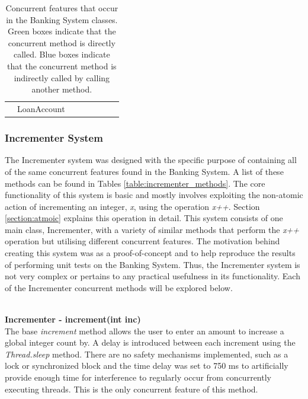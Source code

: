 \documentclass[a4paper,12pt]{article}
\begin{document}
\begin{table}[]
\begin{tabular}{lcllllll}
\multicolumn{1}{l|}{}                                                                                         & \multicolumn{1}{c|}{LoanAccount}    & \multicolumn{1}{l|}{\cellcolor[HTML]{32CB00}} & \multicolumn{1}{l|}{\cellcolor[HTML]{32CB00}} & \multicolumn{1}{l|}{\cellcolor[HTML]{31A4FF}} & \multicolumn{1}{l|}{\cellcolor[HTML]{31A4FF}} & \multicolumn{1}{l|}{\cellcolor[HTML]{31A4FF}} & \multicolumn{1}{l|}{\cellcolor[HTML]{31A4FF}} \\ \cline{2-8} 
\end{tabular}
\caption{Concurrent features that occur in the Banking System classes. Green boxes indicate that the concurrent method is directly called. Blue boxes indicate that the concurrent method is indirectly called by calling another method.}
\label{table:bank_concurrent_classes}
\end{table}


\subsubsection{Incrementer System}
The Incrementer system was designed with the specific purpose of containing all of the same concurrent features found in the Banking System. A list of these methods can be found in Tables \ref{table:incrementer_methods}. The core functionality of this system is basic and mostly involves exploiting the non-atomic action of incrementing an integer, \textit{x}, using the operation \textit{x++}. Section \ref{section:atmoic} explains this operation in detail. This system consists of one main class, Incrementer, with a variety of similar methods that perform the \textit{x++} operation but utilising different concurrent features. The motivation behind creating this system was as a proof-of-concept and to help reproduce the results of performing unit tests on the Banking System. Thus, the Incrementer system is not very complex or pertains to any practical usefulness in its functionality. Each of the Incrementer concurrent methods will be explored below.        
	    
\textbf{\\Incrementer - increment(int inc)}	    
\\The base \textit{increment} method allows the user to enter an amount to increase a global integer count by. A delay is introduced between each increment using the \textit{Thread.sleep} method. There are no safety mechanisms implemented, such as a lock or synchronized block and  the time delay was set to 750 ms to artificially provide enough time for interference to regularly occur from concurrently executing threads. This is the only concurrent feature of this method.  
\end{document}
